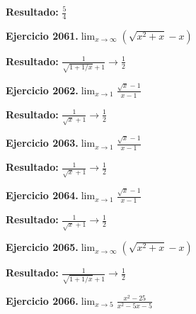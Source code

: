 \documentclass[10pt,a4paper]{article}
\begin{document}
\begin{solbox}
\textbf{Resultado:} \(\displaystyle \frac{5}{4}\)
\end{solbox}

\begin{ejbox}
\textbf{Ejercicio 2061.}\quad $\lim_{x\to \infty} (\sqrt{x^2+x} - x)$
\end{ejbox}

\begin{solbox}
\textbf{Resultado:} \(\displaystyle \frac{1}{\sqrt{1+1/x}+1} \to \frac{1}{2}\)
\end{solbox}

\begin{ejbox}
\textbf{Ejercicio 2062.}\quad $\lim_{x\to 1} \frac{\sqrt{x}-1}{x-1}$
\end{ejbox}

\begin{solbox}
\textbf{Resultado:} \(\displaystyle \frac{1}{\sqrt{x}+1} \to \frac{1}{2}\)
\end{solbox}

\newpage
\begin{ejbox}
\textbf{Ejercicio 2063.}\quad $\lim_{x\to 1} \frac{\sqrt{x}-1}{x-1}$
\end{ejbox}

\begin{solbox}
\textbf{Resultado:} \(\displaystyle \frac{1}{\sqrt{x}+1} \to \frac{1}{2}\)
\end{solbox}

\begin{ejbox}
\textbf{Ejercicio 2064.}\quad $\lim_{x\to 1} \frac{\sqrt{x}-1}{x-1}$
\end{ejbox}

\begin{solbox}
\textbf{Resultado:} \(\displaystyle \frac{1}{\sqrt{x}+1} \to \frac{1}{2}\)
\end{solbox}

\begin{ejbox}
\textbf{Ejercicio 2065.}\quad $\lim_{x\to \infty} (\sqrt{x^2+x} - x)$
\end{ejbox}

\begin{solbox}
\textbf{Resultado:} \(\displaystyle \frac{1}{\sqrt{1+1/x}+1} \to \frac{1}{2}\)
\end{solbox}

\newpage
\begin{ejbox}
\textbf{Ejercicio 2066.}\quad $\lim_{x\to 5} \frac{x^2-25}{x^2-5x-5}$
\end{ejbox}
\end{document}

